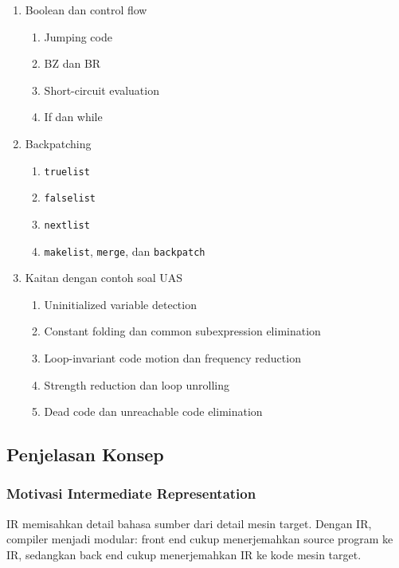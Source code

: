 \begin{enumerate}
\begin{enumerate}
        \item \ppaham Pointer
    \end{enumerate}
    \item \pwajib Boolean dan control flow
    \begin{enumerate}
        \item \pwajib Jumping code
        \item \pwajib BZ dan BR
        \item \pwajib Short-circuit evaluation
        \item \pwajib If dan while
    \end{enumerate}
    \item \pwajib Backpatching
    \begin{enumerate}
        \item \pwajib \texttt{truelist}
        \item \pwajib \texttt{falselist}
        \item \pwajib \texttt{nextlist}
        \item \pwajib \texttt{makelist}, \texttt{merge}, dan \texttt{backpatch}
    \end{enumerate}
    \item \ppaham Kaitan dengan contoh soal UAS
    \begin{enumerate}
        \item \ppaham Uninitialized variable detection
        \item \ppaham Constant folding dan common subexpression elimination
        \item \ppaham Loop-invariant code motion dan frequency reduction
        \item \ppaham Strength reduction dan loop unrolling
        \item \ppaham Dead code dan unreachable code elimination
    \end{enumerate}
\end{enumerate}

\subsection{Penjelasan Konsep}

\subsubsection{Motivasi Intermediate Representation}

\begin{jawab}
IR memisahkan detail bahasa sumber dari detail mesin target. Dengan IR, compiler menjadi modular: front end cukup menerjemahkan source program ke IR, sedangkan back end cukup menerjemahkan IR ke kode mesin target.
\end{jawab}

